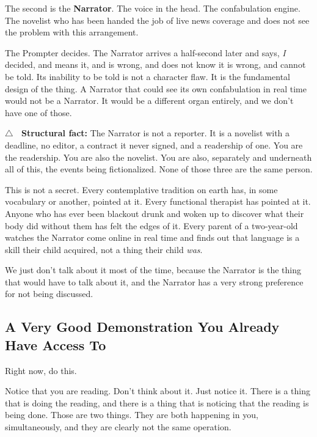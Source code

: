 \documentclass[11pt, letterpaper]{article}
\newcommand{\vocab}[1]{\textbf{\textcolor{meatred}{#1}}}
\begin{document}
The second is the \vocab{Narrator}. The voice in the head. The confabulation engine. The novelist who has been handed the job of live news coverage and does not see the problem with this arrangement.

The Prompter decides. The Narrator arrives a half-second later and says, \textit{I} decided, and means it, and is wrong, and does not know it is wrong, and cannot be told. Its inability to be told is not a character flaw. It is the fundamental design of the thing. A Narrator that could see its own confabulation in real time would not be a Narrator. It would be a different organ entirely, and we don't have one of those.

\begin{warningbox}
\textbf{$\bigtriangleup$ \ Structural fact:} The Narrator is not a reporter. It is a novelist with a deadline, no editor, a contract it never signed, and a readership of one. You are the readership. You are also the novelist. You are also, separately and underneath all of this, the events being fictionalized. None of those three are the same person.
\end{warningbox}

This is not a secret. Every contemplative tradition on earth has, in some vocabulary or another, pointed at it. Every functional therapist has pointed at it. Anyone who has ever been blackout drunk and woken up to discover what their body did without them has felt the edges of it. Every parent of a two-year-old watches the Narrator come online in real time and finds out that language is a skill their child acquired, not a thing their child \textit{was}.

We just don't talk about it most of the time, because the Narrator is the thing that would have to talk about it, and the Narrator has a very strong preference for not being discussed.

\subsection{A Very Good Demonstration You Already Have Access To}

Right now, do this.

Notice that you are reading. Don't think about it. Just notice it. There is a thing that is doing the reading, and there is a thing that is noticing that the reading is being done. Those are two things. They are both happening in you, simultaneously, and they are clearly not the same operation.
\end{document}
